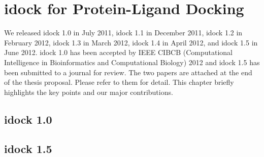 \chapter{idock for Protein-Ligand Docking}

We released idock 1.0 in July 2011, idock 1.1 in December 2011, idock 1.2 in February 2012, idock 1.3 in March 2012, idock 1.4 in April 2012, and idock 1.5 in June 2012. idock 1.0 has been accepted by IEEE CIBCB (Computational Intelligence in Bioinformatics and Computational Biology) 2012 and idock 1.5 has been submitted to a journal for review. The two papers are attached at the end of the thesis proposal. Please refer to them for detail. This chapter briefly highlights the key points and our major contributions.

\section{idock 1.0}



\section{idock 1.5}



\chapterend
